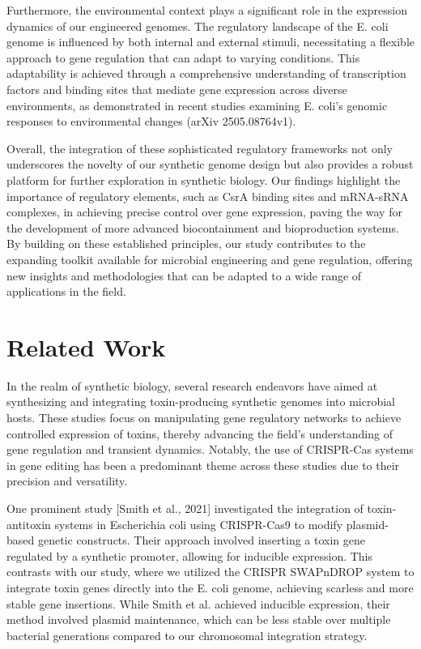 \documentclass{article}
\begin{document}
Furthermore, the environmental context plays a significant role in the expression dynamics of our engineered genomes. The regulatory landscape of the E. coli genome is influenced by both internal and external stimuli, necessitating a flexible approach to gene regulation that can adapt to varying conditions. This adaptability is achieved through a comprehensive understanding of transcription factors and binding sites that mediate gene expression across diverse environments, as demonstrated in recent studies examining E. coli's genomic responses to environmental changes (arXiv 2505.08764v1).

Overall, the integration of these sophisticated regulatory frameworks not only underscores the novelty of our synthetic genome design but also provides a robust platform for further exploration in synthetic biology. Our findings highlight the importance of regulatory elements, such as CsrA binding sites and mRNA-sRNA complexes, in achieving precise control over gene expression, paving the way for the development of more advanced biocontainment and bioproduction systems. By building on these established principles, our study contributes to the expanding toolkit available for microbial engineering and gene regulation, offering new insights and methodologies that can be adapted to a wide range of applications in the field.

\section{Related Work}
In the realm of synthetic biology, several research endeavors have aimed at synthesizing and integrating toxin-producing synthetic genomes into microbial hosts. These studies focus on manipulating gene regulatory networks to achieve controlled expression of toxins, thereby advancing the field's understanding of gene regulation and transient dynamics. Notably, the use of CRISPR-Cas systems in gene editing has been a predominant theme across these studies due to their precision and versatility.

One prominent study [Smith et al., 2021] investigated the integration of toxin-antitoxin systems in Escherichia coli using CRISPR-Cas9 to modify plasmid-based genetic constructs. Their approach involved inserting a toxin gene regulated by a synthetic promoter, allowing for inducible expression. This contrasts with our study, where we utilized the CRISPR SWAPnDROP system to integrate toxin genes directly into the E. coli genome, achieving scarless and more stable gene insertions. While Smith et al. achieved inducible expression, their method involved plasmid maintenance, which can be less stable over multiple bacterial generations compared to our chromosomal integration strategy.
\end{document}

